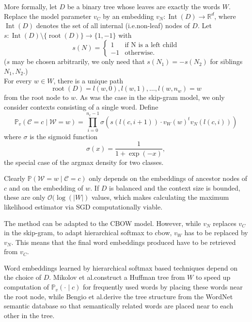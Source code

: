 \documentclass{amsart}
\theoremstyle{plain}
\theoremstyle{definition}
\newcommand{\R}{\mathbb{R}}
\renewcommand{\P}{\mathbb{P}}
\DeclareMathOperator{\Int}{Int}
\DeclareMathOperator{\rootnode}{root}
\begin{document}
More formally, let $D$ be a binary tree whose leaves are exactly the words $W$.
Replace the model parameter $v_C$ by an embedding $v_N : \Int(D) \rightarrow \R^d$, where $\Int(D)$ denotes the set of all internal (i.e.\@ non-leaf) nodes of $D$.
Let $s :\Int(D) \setminus \{\rootnode(D)\} \rightarrow \{1, -1\}$ with 
\begin{equation*}
  s(N) = \begin{cases}
    1 & \text{if N is a left child} \\
    -1 & \text{otherwise.}
      \end{cases}
\end{equation*}
($s$ may be chosen arbitrarily, we only need that $s(N_1) = -s(N_2)$ for siblings $N_1, N_2$.) \\
For every $w \in W$, there is a unique path 
\begin{equation*}
  \rootnode(D) = l(w, 0), l(w, 1), \dots, l(w, n_w) = w
\end{equation*}
from the root node to $w$.
As was the case in the skip-gram model, we only consider contexts consisting of a single word.
Define
\begin{equation}
  \P_v(\mathcal{C} = c \mid \mathcal{W} = w) = \prod_{i = 0}^{n_c - 1} \sigma \left( s(l(c, i + 1)) \cdot v_W(w)^t v_N(l(c, i)) \right)
\end{equation}
where $\sigma$ is the sigmoid function
\begin{equation*}
  \sigma(x) = \frac{1}{1 + \exp(-x)},
\end{equation*}
the special case of the argmax density for two classes.

Clearly $\P(\mathcal{W} = w \mid \mathcal{C} = c)$ only depends on the embeddings of ancestor nodes of $c$ and on the embedding of $w$.
If $D$ is balanced and the context size is bounded, these are only $\mathcal{O}(\log(|W|)$ values, which makes calculating the maximum likelihood estimator via SGD computationally viable.

The method can be adapted to the CBOW model.
However, while $v_N$ replaces $v_C$ in the skip-gram, to adapt hierarchical softmax to cbow, $v_W$ has to be replaced by $v_N$.
This means that the final word embeddings produced have to be retrieved from $v_C$.

Word embeddings learned by hierarchical softmax based techniques depend on the choice of $D$.
Mikolov et al.\@ construct a Huffman tree from $W$ to speed up computation of $\P_v(\cdot \mid c)$ for frequently used words by placing these words near the root node, while Bengio et al.\@ derive the tree structure from the WordNet \cite{WordNet} semantic database so that semantically related words are placed near to each other in the tree.
\end{document}
